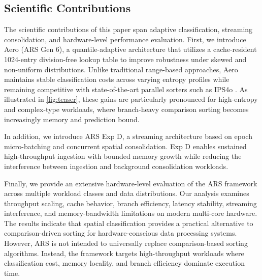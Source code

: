 \subsection{Scientific Contributions}
The scientific contributions of this paper span adaptive classification, streaming consolidation, and hardware-level performance evaluation.
First, we introduce Aero (ARS Gen 6), a quantile-adaptive architecture that utilizes a cache-resident 1024-entry division-free lookup table to improve robustness under skewed and non-uniform distributions.
Unlike traditional range-based approaches, Aero maintains stable classification costs across varying entropy profiles while remaining competitive with state-of-the-art parallel sorters such as IPS4o \cite{axtmannInPlaceParallelSuper2017}.
As illustrated in \cref{fig:teaser}, these gains are particularly pronounced for high-entropy and complex-type workloads, where branch-heavy comparison sorting becomes increasingly memory and prediction bound.

In addition, we introduce ARS Exp D, a streaming architecture based on epoch micro-batching and concurrent spatial consolidation.
Exp D enables sustained high-throughput ingestion with bounded memory growth while reducing the interference between ingestion and background consolidation workloads.

Finally, we provide an extensive hardware-level evaluation of the ARS framework across multiple workload classes and data distributions.
Our analysis examines throughput scaling, cache behavior, branch efficiency, latency stability, streaming interference, and memory-bandwidth limitations on modern multi-core hardware.
The results indicate that spatial classification provides a practical alternative to comparison-driven sorting for hardware-conscious data processing systems.
However, ARS is not intended to universally replace comparison-based sorting algorithms.
Instead, the framework targets high-throughput workloads where classification cost, memory locality, and branch efficiency dominate execution time.
